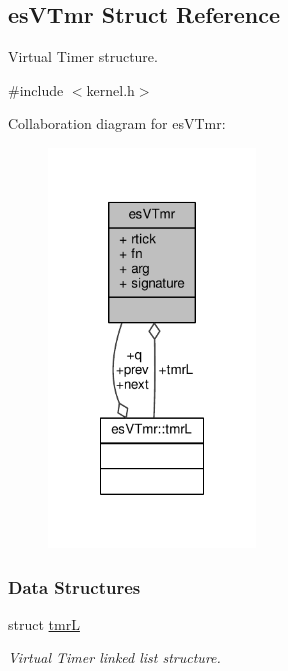 \hypertarget{structesVTmr}{\subsection{es\-V\-Tmr Struct Reference}
\label{structesVTmr}
}


Virtual Timer structure.  




{\ttfamily \#include $<$kernel.\-h$>$}



Collaboration diagram for es\-V\-Tmr\-:\nopagebreak
\begin{figure}[H]
\begin{center}
\leavevmode
\includegraphics[width=156pt]{structesVTmr__coll__graph}
\end{center}
\end{figure}
\subsubsection*{Data Structures}
\begin{DoxyCompactItemize}
\item 
struct \hyperlink{structesVTmr_1_1tmrL}{tmr\-L}
\begin{DoxyCompactList}\small\item\em Virtual Timer linked list structure. \end{DoxyCompactList}\end{DoxyCompactItemize}
